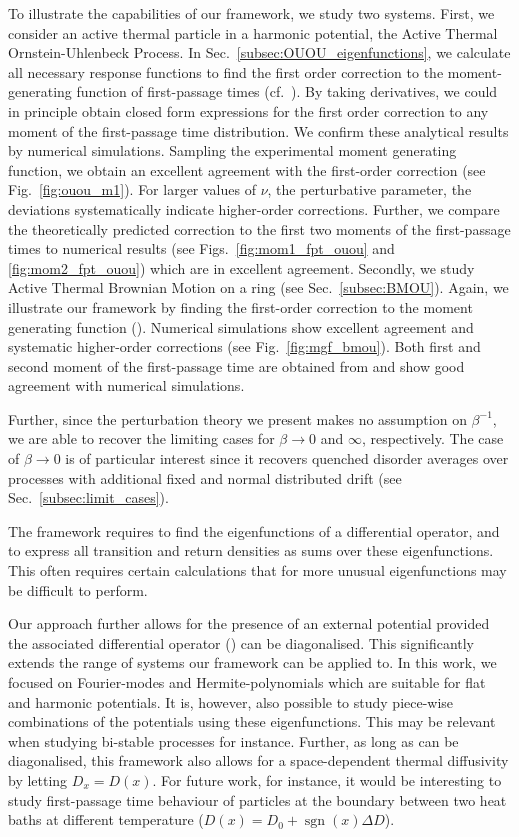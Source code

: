 \documentclass[%
 reprint,
superscriptaddress,
nofootinbib,
 amsmath,amssymb,
 aps,
prx,
]{revtex4-2}
\begin{document}
To illustrate  the capabilities of our framework, we study two systems.
First, we consider an active thermal particle  in a harmonic potential, the Active Thermal Ornstein-Uhlenbeck Process. In Sec.~\ref{subsec:OUOU_eigenfunctions}, we calculate all necessary response functions to find the first order correction to the moment-generating function of first-passage times (cf.~). By taking derivatives, we could in principle obtain closed form expressions for the first order correction to any moment of the first-passage time distribution. We confirm these analytical results by numerical simulations. Sampling the experimental moment generating function, we obtain an excellent agreement with the first-order correction (see Fig.~\ref{fig:ouou_m1}). For larger values of $\nu$, the perturbative parameter, the deviations systematically indicate higher-order corrections. Further, we compare the theoretically predicted correction to the first two moments of the first-passage times to numerical results (see Figs.~\ref{fig:mom1_fpt_ouou} and \ref{fig:mom2_fpt_ouou}) which are in excellent agreement.
Secondly, we study Active Thermal Brownian Motion on a ring (see Sec.~\ref{subsec:BMOU}). Again, we illustrate our framework by finding the first-order correction to the moment generating function (\cf {}). Numerical simulations show excellent agreement and systematic higher-order corrections (see Fig.~\ref{fig:mgf_bmou}). Both first and second moment of the first-passage time are obtained from  and show good agreement with numerical simulations.

Further, since the perturbation theory we present makes no assumption on $\beta^{-1}$, we are able to recover the limiting cases for $\beta \to 0$ and $\infty$, respectively. The case of $\beta \to 0$ is of particular interest since it recovers  quenched disorder averages over processes with additional fixed and normal distributed drift (see Sec.~\ref{subsec:limit_cases}).

The framework requires to find the eigenfunctions of a differential operator, and to express all transition and return densities as sums over these eigenfunctions. This often requires certain calculations that for more unusual eigenfunctions may be difficult to perform.


Our approach further allows for the presence of an external potential provided the associated differential operator () can be diagonalised. This significantly extends the range of systems our framework can be applied to.  In this work, we focused on Fourier-modes and Hermite-polynomials which are suitable for flat and harmonic potentials. It is, however, also possible to study piece-wise combinations of the potentials using these eigenfunctions. This may be relevant when studying bi-stable processes for instance.
Further, as long as  can be diagonalised,
 this framework also allows for a space-dependent thermal diffusivity by letting $D_x = D(x)$. 
For future work, for instance, it would be interesting to study first-passage time behaviour of particles at the boundary between two heat baths at different temperature (\eg $D(x) = D_0 + \operatorname{sgn}(x)\Delta D$).
\end{document}
